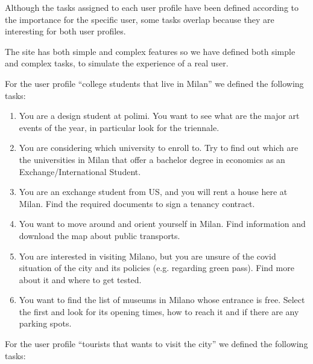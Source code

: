     Although the tasks assigned to each user profile have been defined according to the importance for the specific user, some tasks overlap because they are interesting for both user profiles.

    The site has both simple and complex features so we have defined both simple and complex tasks, to simulate the experience of a real user.
    
    For the user profile ``college students that live in Milan'' we defined the following tasks:

    \begin{enumerate}
        
        \item You are a design student at polimi. You want to see what are the major art events of the year, in particular look for the triennale.
        \item You are considering which university to enroll to. Try to find out which are the universities in Milan that offer a bachelor degree in economics as an Exchange/International Student.
        \item You are an exchange student from US, and you will rent a house here at Milan. Find the required documents to sign a tenancy contract.
        \item You want to move around and orient yourself in Milan. Find information and download the map about public transports.
        \item You are interested in visiting Milano, but you are unsure of the covid situation of the city and its policies (e.g. regarding green pass). Find more about it and where to get tested.
        \item You want to find the list of museums in Milano whose entrance is free. Select the first and look for its opening times, how to reach it and if there are any parking spots. 
    \end{enumerate}
        For the user profile “tourists that wants to visit the city” we defined the following tasks:
